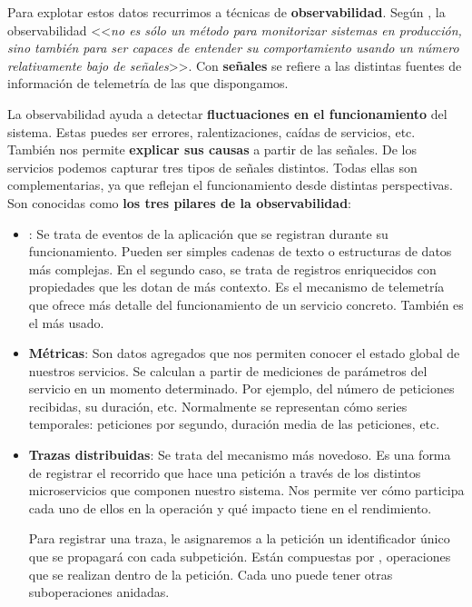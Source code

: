 Para explotar estos datos recurrimos a técnicas de \textbf{observabilidad}. Según \cite{parkerProblemDistributedTracing2020}, la observabilidad <<\emph{no es sólo un método para monitorizar sistemas en producción, sino también para ser capaces de entender su comportamiento usando un número relativamente bajo de señales}>>. Con \textbf{señales} se refiere a las distintas fuentes de información de telemetría de las que dispongamos.

La observabilidad ayuda a detectar \textbf{fluctuaciones en el funcionamiento} del sistema. Estas puedes ser errores, ralentizaciones, caídas de servicios, etc. También nos permite \textbf{explicar sus causas} a partir de las señales. De los servicios podemos capturar tres tipos de señales distintos. Todas ellas son complementarias, ya que reflejan el funcionamiento desde distintas perspectivas. Son conocidas como \textbf{los tres pilares de la observabilidad}:

\begin{itemize}
  \item \textbf{}: Se trata de eventos de la aplicación que se registran durante su funcionamiento. Pueden ser simples cadenas de texto o estructuras de datos más complejas. En el segundo caso, se trata de registros enriquecidos con propiedades que les dotan de más contexto. Es el mecanismo de telemetría que ofrece más detalle del funcionamiento de un servicio concreto. También es el más usado.

  \item \textbf{Métricas}: Son datos agregados que nos permiten conocer el estado global de nuestros servicios. \cite{opentelemetryOpenTelemetryDocumentation2022} Se calculan a partir de mediciones de parámetros del servicio en un momento determinado. Por ejemplo, del número de peticiones recibidas, su duración, etc. Normalmente se representan cómo series temporales: peticiones por segundo, duración media de las peticiones, etc.

  \item \textbf{Trazas distribuidas}: Se trata del mecanismo más novedoso. Es una forma de registrar el recorrido que hace una petición a través de los distintos microservicios que componen nuestro sistema. Nos permite ver cómo participa cada uno de ellos en la operación y qué impacto tiene en el rendimiento. \cite{parkerProblemDistributedTracing2020}

  Para registrar una traza, le asignaremos a la petición un identificador único que se propagará con cada subpetición. Están compuestas por , operaciones que se realizan dentro de la petición. Cada uno puede tener otras suboperaciones anidadas. \cite{opentelemetryOpenTelemetryDocumentation2022}
\end{itemize}

